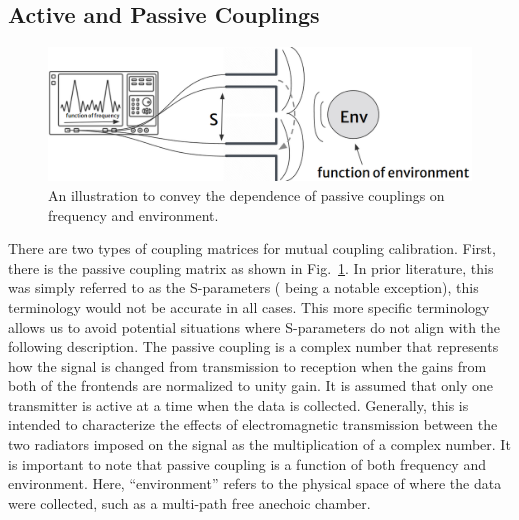 \documentclass[journal]{IEEEtran}
\begin{document}
\subsection{Active and Passive Couplings}


\begin{figure}[hptb]
    \centering
    \includegraphics[width=1\linewidth]{PassiveCouplingWithArrow.png}
    \caption{An illustration to convey the dependence of passive couplings on frequency and environment.}
    \label{fig:passiveCoupling}
\end{figure}

There are two types of coupling matrices for mutual coupling calibration. First, there is the passive coupling matrix as shown in Fig.~\ref{fig:passiveCoupling}. In prior literature, this was simply referred to as the S-parameters (\cite{bekers} being a notable exception), this terminology would not be accurate in all cases. This more specific terminology allows us to avoid potential situations where S-parameters do not align with the following description. The passive coupling is a complex number that represents how the signal is changed from transmission to reception when the gains from both of the frontends are normalized to unity gain. It is assumed that only one transmitter is active at a time when the data is collected. Generally, this is intended to characterize the effects of electromagnetic transmission between the two radiators imposed on the signal as the multiplication of a complex number. It is important to note that passive coupling is a function of both frequency and environment.  Here, ``environment'' refers to the physical space of where the data were collected, such as a multi-path free anechoic chamber. 
\end{document}
